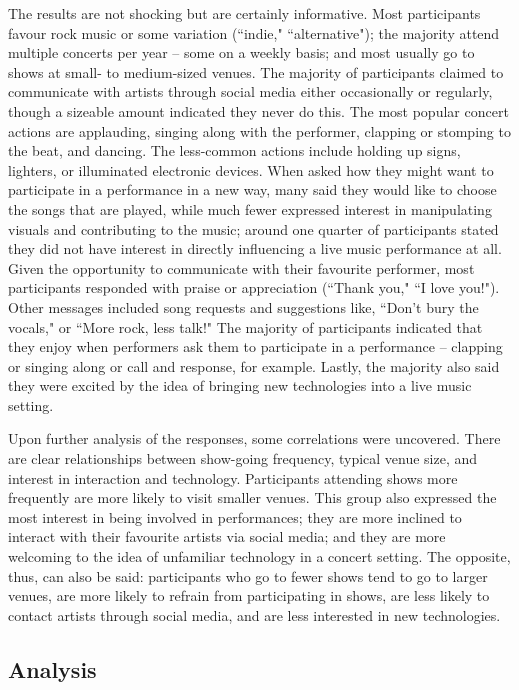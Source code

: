 The results are not shocking but are certainly informative. Most participants favour rock music or some variation (``indie," ``alternative"); the majority attend multiple concerts per year -- some on a weekly basis; and most usually go to shows at small- to medium-sized venues. The majority of participants claimed to communicate with artists through social media either occasionally or regularly, though a sizeable amount indicated they never do this. The most popular concert actions are applauding, singing along with the performer, clapping or stomping to the beat, and dancing. The less-common actions include holding up signs, lighters, or illuminated electronic devices. When asked how they might want to participate in a performance in a new way, many said they would like to choose the songs that are played, while much fewer expressed interest in manipulating visuals and contributing to the music; around one quarter of participants stated they did not have interest in directly influencing a live music performance at all. Given the opportunity to communicate with their favourite performer, most participants responded with praise or appreciation (``Thank you," ``I love you!"). Other messages included song requests and suggestions like, ``Don't bury the vocals," or ``More rock, less talk!" The majority of participants indicated that they enjoy when performers ask them to participate in a performance -- clapping or singing along or call and response, for example. Lastly, the majority also said they were excited by the idea of bringing new technologies into a live music setting.

Upon further analysis of the responses, some correlations were uncovered. There are clear relationships between show-going frequency, typical venue size, and interest in interaction and technology. Participants attending shows more frequently are more likely to visit smaller venues. This group also expressed the most interest in being involved in performances; they are more inclined to interact with their favourite artists via social media; and they are more welcoming to the idea of unfamiliar technology in a concert setting. The opposite, thus, can also be said: participants who go to fewer shows tend to go to larger venues, are more likely to refrain from participating in shows, are less likely to contact artists through social media, and are less interested in new technologies.

\subsection{Analysis}

